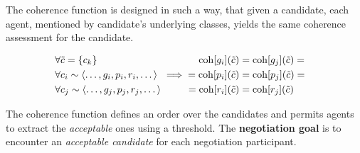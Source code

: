The coherence function is designed in such a way, that given a candidate,
each agent, mentioned by candidate's underlying classes, yields the same
coherence assessment for the candidate.


\begin{align*}
  \begin{aligned}
    &\forall \tilde{c} = \{c_k\} \\
    &\forall c_i \sim \left< \dots, g_i, p_i, r_i, \dots \right> \\
    &\forall c_j \sim \left< \dots, g_j, p_j, r_j, \dots \right>
  \end{aligned}
& \implies
  \begin{aligned}
   \mathrm{coh}[g_i](\tilde c) &= \mathrm{coh}[g_j](\tilde c) = \\
   = \mathrm{coh}[p_i](\tilde c) &= \mathrm{coh}[p_j](\tilde c) = \\  
   = \mathrm{coh}[r_i](\tilde c) &= \mathrm{coh}[r_j](\tilde c)
  \end{aligned}
\end{align*}

\medskip

\noindent
The coherence function defines an order over the candidates and permits
agents to extract the \emph{acceptable} ones using a threshold.
The \textbf{negotiation goal} is to encounter an \emph{acceptable candidate}
for each negotiation participant.






%